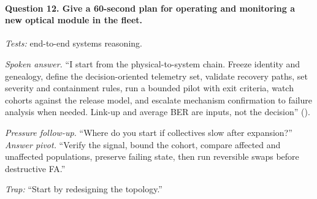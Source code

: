 \paragraph{Question 12. Give a 60-second plan for operating and monitoring a
new optical module in the fleet.}
\textit{Tests:} end-to-end systems reasoning.

\textit{Spoken answer.}
``I start from the physical-to-system chain. Freeze identity and genealogy,
define the decision-oriented telemetry set, validate recovery paths, set
severity and containment rules, run a bounded pilot with exit criteria, watch
cohorts against the release model, and escalate mechanism confirmation to
failure analysis when needed. Link-up and average BER are inputs, not the
decision''
().

\textit{Pressure follow-up.} ``Where do you start if collectives slow after
expansion?''\\
\textit{Answer pivot.} ``Verify the signal, bound the cohort, compare
affected and unaffected populations, preserve failing state, then run
reversible swaps before destructive FA.''

\textit{Trap:} ``Start by redesigning the topology.''
